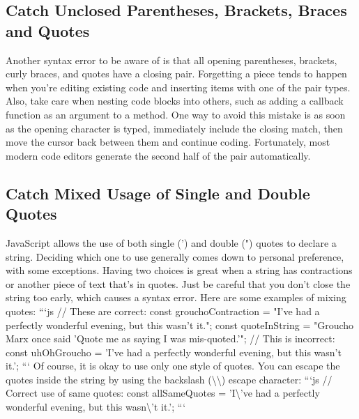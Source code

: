 \documentclass{article}%
\begin{document}
\subsection{Catch Unclosed Parentheses, Brackets, Braces and Quotes}%
\label{subsec:CatchUnclosedParentheses,Brackets,BracesandQuotes}%
Another syntax error to be aware of is that all opening parentheses, brackets, curly braces, and quotes have a closing pair. Forgetting a piece tends to happen when you're editing existing code and inserting items with one of the pair types. Also, take care when nesting code blocks into others, such as adding a callback function as an argument to a method.\newline%
One way to avoid this mistake is as soon as the opening character is typed, immediately include the closing match, then move the cursor back between them and continue coding. Fortunately, most modern code editors generate the second half of the pair automatically.\newline%

%
\subsection{Catch Mixed Usage of Single and Double Quotes}%
\label{subsec:CatchMixedUsageofSingleandDoubleQuotes}%
JavaScript allows the use of both single (') and double (") quotes to declare a string. Deciding which one to use generally comes down to personal preference, with some exceptions.\newline%
Having two choices is great when a string has contractions or another piece of text that's in quotes. Just be careful that you don't close the string too early, which causes a syntax error.\newline%
Here are some examples of mixing quotes:\newline%
```js\newline%
// These are correct:\newline%
const grouchoContraction = "I've had a perfectly wonderful evening, but this wasn't it.";\newline%
const quoteInString = "Groucho Marx once said 'Quote me as saying I was mis{-}quoted.'";\newline%
// This is incorrect:\newline%
const uhOhGroucho = 'I've had a perfectly wonderful evening, but this wasn't it.';\newline%
```\newline%
Of course, it is okay to use only one style of quotes. You can escape the quotes inside the string by using the backslash (\textbackslash{}\textbackslash{}) escape character:\newline%
```js\newline%
// Correct use of same quotes:\newline%
const allSameQuotes = 'I\textbackslash{}'ve had a perfectly wonderful evening, but this wasn\textbackslash{}'t it.';\newline%
```\newline%
\end{document}
